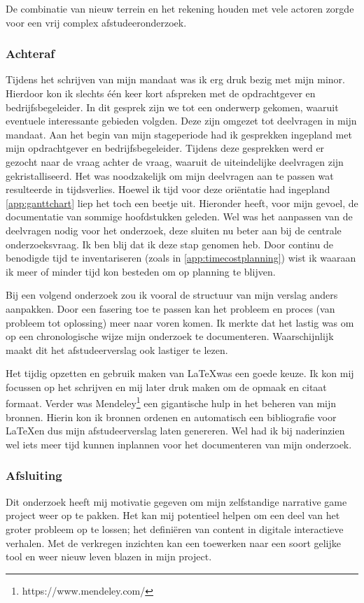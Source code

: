 De combinatie van nieuw terrein en het rekening houden met vele actoren zorgde voor een vrij complex afstudeeronderzoek.

\subsubsection{Achteraf}
Tijdens het schrijven van mijn mandaat was ik erg druk bezig met mijn minor. Hierdoor kon ik slechts één keer kort afspreken met de opdrachtgever en bedrijfsbegeleider. In dit gesprek zijn we tot een onderwerp gekomen, waaruit eventuele interessante gebieden volgden. Deze zijn omgezet tot deelvragen in mijn mandaat. Aan het begin van mijn stageperiode had ik gesprekken ingepland met mijn opdrachtgever en bedrijfsbegeleider. Tijdens deze gesprekken werd er gezocht naar de vraag achter de vraag, waaruit de uiteindelijke deelvragen zijn gekristalliseerd. Het was noodzakelijk om mijn deelvragen aan te passen wat resulteerde in tijdsverlies. Hoewel ik tijd voor deze oriëntatie had ingepland \autoref{app:ganttchart} liep het toch een beetje uit. Hieronder heeft, voor mijn gevoel, de documentatie van sommige hoofdstukken geleden. Wel was het aanpassen van de deelvragen nodig voor het onderzoek, deze sluiten nu beter aan bij de centrale onderzoeksvraag. Ik ben blij dat ik deze stap genomen heb. Door continu de benodigde tijd te inventariseren (zoals in \autoref{app:timecostplanning}) wist ik waaraan ik meer of minder tijd kon besteden om op planning te blijven.

Bij een volgend onderzoek zou ik vooral de structuur van mijn verslag anders aanpakken. Door een fasering toe te passen kan het probleem en proces (van probleem tot oplossing) meer naar voren komen. Ik merkte dat het lastig was om op een chronologische wijze mijn onderzoek te documenteren. Waarschijnlijk maakt dit het afstudeerverslag ook lastiger te lezen.

Het tijdig opzetten en gebruik maken van \LaTeX was een goede keuze. Ik kon mij focussen op het schrijven en mij later druk maken om de opmaak en citaat formaat. Verder was Mendeley\footnote{https://www.mendeley.com/} een gigantische hulp in het beheren van mijn bronnen. Hierin kon ik bronnen ordenen en automatisch een bibliografie voor \LaTeX en dus mijn afstudeerverslag laten genereren. Wel had ik bij naderinzien wel iets meer tijd kunnen inplannen voor het documenteren van mijn onderzoek.

\subsubsection{Afsluiting}
Dit onderzoek heeft mij motivatie gegeven om mijn zelfstandige narrative game project weer op te pakken. Het kan mij potentieel helpen om een deel van het groter probleem op te lossen; het definiëren van content in digitale interactieve verhalen. Met de verkregen inzichten kan een toewerken naar een soort gelijke tool en weer nieuw leven blazen in mijn project.